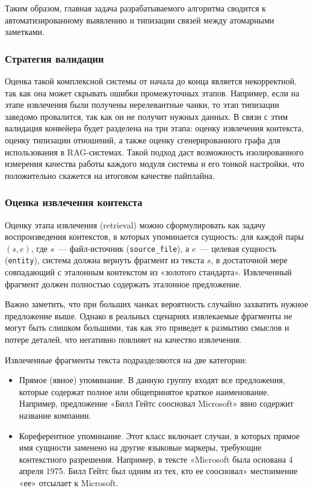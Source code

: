 Таким образом, главная задача разрабатываемого алгоритма
сводится к автоматизированному выявлению и
типизации связей между атомарными заметками.

\subsubsection*{Стратегия валидации}

Оценка такой комплексной системы от начала до конца
является некорректной, так как она может скрывать ошибки промежуточных этапов.
Например, если на этапе извлечения были получены нерелевантные чанки,
то этап типизации заведомо провалится, так как он не получит нужных данных.
В связи с этим валидация конвейера будет разделена на три этапа:
оценку извлечения контекста,
оценку типизации отношений,
а также оценку сгенерированного графа для использования в RAG-системах.
Такой подход даст возможность изолированного измерения качества
работы каждого модуля системы и его тонкой настройки,
что положительно скажется на итоговом качестве пайплайна.

\subsubsection*{Оценка извлечения контекста}

Оценку этапа извлечения (retrieval) можно сформулировать как задачу воспроизведения контекстов,
в которых упоминается сущность:
для каждой пары \((s, e)\), где \(s\)~--- файл-источник (\texttt{source\_file}),
а \(e\)~--- целевая сущность (\texttt{entity}),
система должна вернуть фрагмент из текста \(s\),
в достаточной мере совпадающий с эталонным контекстом из «золотого стандарта».
Извлеченный фрагмент должен полностью содержать эталонное предложение.

Важно заметить, что при больших чанках вероятность случайно захватить
нужное предложение выше.
Однако в реальных сценариях
извлекаемые фрагменты не могут быть слишком большими,
так как это приведет к размытию смыслов и потере деталей,
что негативно повлияет на качество извлечения.

Извлеченные фрагменты текста подразделяются на две категории:
\begin{itemize}
      \item Прямое (явное) упоминание.
            В данную группу входят все предложения,
            которые содержат полное или общепринятое краткое наименование.
            Например, предложение «Билл Гейтс соосновал Microsoft» явно содержит название компании.
      \item Кореферентное упоминание. Этот класс включает случаи,
            в которых прямое имя сущности заменено на
            другие языковые маркеры, требующие контекстного разрешения.
            Например, в тексте «Microsoft была основана 4 апреля 1975.
            Билл Гейтс был одним из тех, кто ее соосновал» местоимение «ее» отсылает к Microsoft.
\end{itemize}

